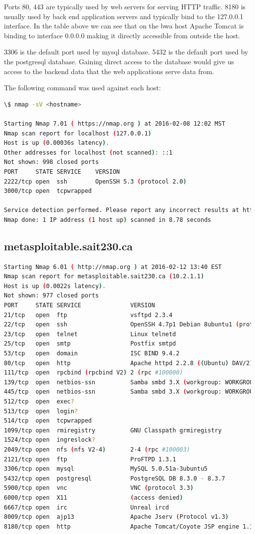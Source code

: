 \documentclass{article}
\begin{document}
Ports 80, 443 are typically used by web servers for serving HTTP traffic.
8180 is usually used by back end application servers and typically bind to the 127.0.0.1
interface. In the table above we can see that on the bwa host Apache Tomcat is binding 
to interface 0.0.0.0 making it directly accessible from outside the host.

3306 is the default port used by mysql database.
5432 is the default port used by the postgresql database.
Gaining direct access to the database would give us access to the backend data
that the web applications serve data from.

\noindent The following command was used against each host:
\begin{lstlisting}[language=bash, firstline=1, lastline=3]
\$ nmap -sV <hostname>

Starting Nmap 7.01 ( https://nmap.org ) at 2016-02-08 12:02 MST
Nmap scan report for localhost (127.0.0.1)
Host is up (0.00036s latency).
Other addresses for localhost (not scanned): ::1
Not shown: 998 closed ports
PORT     STATE SERVICE    VERSION
2222/tcp open  ssh        OpenSSH 5.3 (protocol 2.0)
3000/tcp open  tcpwrapped

Service detection performed. Please report any incorrect results at https://nmap.org/submit/ .
Nmap done: 1 IP address (1 host up) scanned in 8.78 seconds
\end{lstlisting}

\newpage
\subsection{metasploitable.sait230.ca}

\begin{lstlisting}[language=bash]
Starting Nmap 6.01 ( http://nmap.org ) at 2016-02-12 13:40 EST
Nmap scan report for metasploitable.sait230.ca (10.2.1.1)
Host is up (0.0022s latency).
Not shown: 977 closed ports
PORT     STATE SERVICE              VERSION
21/tcp   open  ftp                  vsftpd 2.3.4
22/tcp   open  ssh                  OpenSSH 4.7p1 Debian 8ubuntu1 (protocol 2.0)
23/tcp   open  telnet               Linux telnetd
25/tcp   open  smtp                 Postfix smtpd
53/tcp   open  domain               ISC BIND 9.4.2
80/tcp   open  http                 Apache httpd 2.2.8 ((Ubuntu) DAV/2)
111/tcp  open  rpcbind (rpcbind V2) 2 (rpc #100000)
139/tcp  open  netbios-ssn          Samba smbd 3.X (workgroup: WORKGROUP)
445/tcp  open  netbios-ssn          Samba smbd 3.X (workgroup: WORKGROUP)
512/tcp  open  exec?
513/tcp  open  login?
514/tcp  open  tcpwrapped
1099/tcp open  rmiregistry          GNU Classpath grmiregistry
1524/tcp open  ingreslock?
2049/tcp open  nfs (nfs V2-4)       2-4 (rpc #100003)
2121/tcp open  ftp                  ProFTPD 1.3.1
3306/tcp open  mysql                MySQL 5.0.51a-3ubuntu5
5432/tcp open  postgresql           PostgreSQL DB 8.3.0 - 8.3.7
5900/tcp open  vnc                  VNC (protocol 3.3)
6000/tcp open  X11                  (access denied)
6667/tcp open  irc                  Unreal ircd
8009/tcp open  ajp13                Apache Jserv (Protocol v1.3)
8180/tcp open  http                 Apache Tomcat/Coyote JSP engine 1.1
\end{lstlisting}
\end{document}
